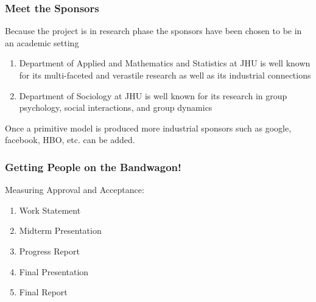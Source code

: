 \documentclass[compress,handout,10pt]{beamer}
\let\olditem\item
\renewcommand{\item}{\setlength{\itemsep}{0.5\baselineskip}\olditem}
\begin{document}
\begin{frame}
  \frametitle{Meet the Sponsors}
   Because the project is in research phase the sponsors have been chosen to be in an academic setting
	\begin{enumerate}
		\item Department of Applied and Mathematics and Statistics at JHU\newline \newline
	is well known for its multi-faceted and verastile research as well as its industrial connections		
		\item Department of Sociology at JHU\newline \newline
	is well known for its research in group psychology, social interactions, and group dynamics
	\end{enumerate} 
\vspace{7pt}

Once a primitive model is produced more industrial sponsors such as google, facebook, HBO, etc. can be added.

\end{frame}




\begin{frame}
    \frametitle{Getting People on the Bandwagon!}
    Measuring Approval and Acceptance:
    \vspace{7pt}
             \begin{enumerate}
                 \item Work Statement
                 \item Midterm Presentation
                 \item Progress Report
                 \item Final Presentation
                 \item Final Report
             \end{enumerate}
\end{frame}
\end{document}
